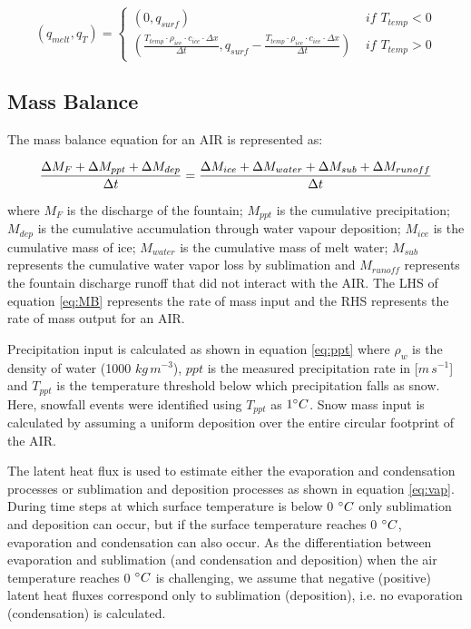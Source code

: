 \documentclass[utf8]{frontiersSCNS} %
\begin{document}
\begin{equation}
	(q_{melt}, q_{T}) = \left\{ \begin{array}{ll}
		(0, q_{surf})                                                                                                                                                 & \textit{ if } T_{temp} < 0 \\
		(\frac{T_{temp} \cdot \rho_{ice} \cdot c_{ice} \cdot \Delta x}{\Delta t}, q_{surf}-\frac{T_{temp} \cdot \rho_{ice} \cdot c_{ice} \cdot \Delta x}{\Delta t}  ) & \textit{ if } T_{temp} > 0
	\end{array} \right.
\end{equation}


\subsection{Mass Balance}
The mass balance equation for an AIR is represented as:

\begin{equation}
	\frac{\Delta M_{F} + \Delta M_{ppt} + \Delta M_{dep}}{\Delta t} = \frac{\Delta M_{ice} +\Delta M_{water} +
		\Delta M_{sub} + \Delta M_{runoff}}{\Delta t}  \\
	\label{eq:MB}
\end{equation}

where $M_{F}$ is the discharge of the fountain; $M_{ppt}$ is the cumulative precipitation;  $M_{dep}$ is the cumulative
accumulation through water vapour deposition; $M_{ice}$ is the cumulative mass of ice; $M_{water}$ is the cumulative
mass of melt water; $M_{sub}$ represents the cumulative water vapor loss by sublimation and $M_{runoff}$ represents the
fountain discharge runoff that did not interact with the AIR. The LHS of equation \ref{eq:MB} represents the rate of
mass input and the RHS represents the rate of mass output for an AIR.

Precipitation input is calculated as shown in equation \ref{eq:ppt} where $\rho_{w}$ is the density of water (1000
$kg\,m^{-3}$), $ppt$ is the measured precipitation rate in [$m\,s^{-1}$] and $T_{ppt}$ is the temperature threshold
below which precipitation falls as snow. Here, snowfall events were identified using $T_{ppt}$ as $1 \degree C$. Snow
mass input is calculated by assuming a uniform deposition over the entire circular footprint of the AIR.

The latent heat flux is used to estimate either the evaporation and condensation processes or sublimation and deposition
processes as shown in equation \ref{eq:vap}. During time steps at which surface temperature is below 0 $\degree C$ only
sublimation and deposition can occur, but if the surface temperature reaches 0 $\degree C$, evaporation and condensation
can also occur. As the differentiation between evaporation and sublimation (and condensation and deposition) when the
air temperature reaches 0 $\degree C$ is challenging, we assume that negative (positive) latent heat fluxes correspond
only to sublimation (deposition), i.e. no evaporation (condensation) is calculated.
\end{document}
